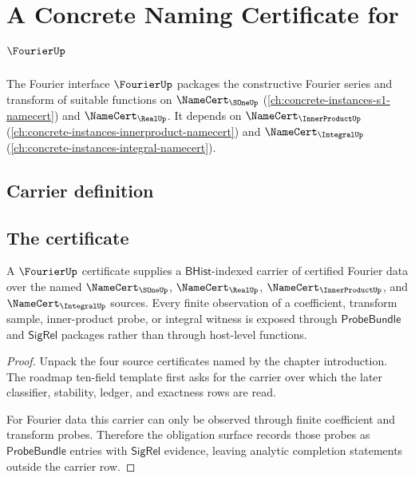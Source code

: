 \chapter{A Concrete Naming Certificate for $\FourierUp$}
\label{ch:concrete-instances-fourier-namecert}

The Fourier interface $\FourierUp$ packages the constructive Fourier series and transform of suitable functions on $\NameCert_{\SOneUp}$ (\autoref{ch:concrete-instances-s1-namecert}) and $\NameCert_{\RealUp}$. It depends on $\NameCert_{\InnerProductUp}$ (\autoref{ch:concrete-instances-innerproduct-namecert}) and $\NameCert_{\IntegralUp}$ (\autoref{ch:concrete-instances-integral-namecert}).

\section{Carrier definition}
\label{sec:fourier-carrier}

\section{The certificate}
\label{sec:fourier-certificate}

\begin{theorem}\label{thm:fourier-carrier-obligation}
A $\FourierUp$ certificate supplies a $\mathsf{BHist}$-indexed carrier of certified Fourier data over the named $\NameCert_{\SOneUp}$, $\NameCert_{\RealUp}$, $\NameCert_{\InnerProductUp}$, and $\NameCert_{\IntegralUp}$ sources. Every finite observation of a coefficient, transform sample, inner-product probe, or integral witness is exposed through $\mathsf{ProbeBundle}$ and $\mathsf{SigRel}$ packages rather than through host-level functions.
\end{theorem}
\begin{proof}
Unpack the four source certificates named by the chapter introduction. The roadmap ten-field template first asks for the carrier over which the later classifier, stability, ledger, and exactness rows are read.

For Fourier data this carrier can only be observed through finite coefficient and transform probes. Therefore the obligation surface records those probes as $\mathsf{ProbeBundle}$ entries with $\mathsf{SigRel}$ evidence, leaving analytic completion statements outside the carrier row.
\end{proof}

